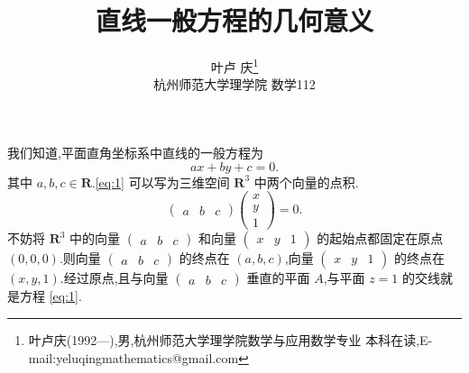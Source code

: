 \documentclass[a4paper]{article}
\begin{document}
\title{\huge{\bf{直线一般方程的几何意义}}} \author{\small{叶卢
    庆\footnote{叶卢庆(1992---),男,杭州师范大学理学院数学与应用数学专业
      本科在读,E-mail:yeluqingmathematics@gmail.com}}\\{\small{杭州师范大学理学院
      数学112}}}
\maketitle
我们知道,平面直角坐标系中直线的一般方程为
\begin{equation}
  \label{eq:1}
  ax+by+c=0.
\end{equation}
其中 $a,b,c\in \mathbf{R}$.\eqref{eq:1} 可以写为三维空间
$\mathbf{R}^3$ 中两个向量的点积. 
$$
\begin{pmatrix}
  a&b&c
\end{pmatrix}\begin{pmatrix}
  x\\
y\\
1
\end{pmatrix}=0.
$$
不妨将 $\mathbf{R}^3$ 中的向量 $\begin{pmatrix}
  a&b&c
\end{pmatrix}$ 和向量 $\begin{pmatrix}
  x&y&1
\end{pmatrix}$ 的起始点都固定在原点 $(0,0,0)$.则向量 $\begin{pmatrix}
  a&b&c
\end{pmatrix}$ 的终点在 $(a,b,c)$,向量 $\begin{pmatrix}
  x&y&1
\end{pmatrix}$ 的终点在 $(x,y,1)$.经过原点,且与向量 $\begin{pmatrix}
  a&b&c
\end{pmatrix}$ 垂直的平面 $A$,与平面 $z=1$ 的交线就是方程 \eqref{eq:1}.
\end{document}
